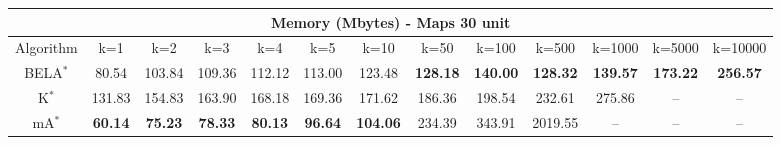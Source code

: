 \begin{tabular}{c|cccccccccccc}\toprule
\multicolumn{13}{c}{Memory (Mbytes) - Maps 30 unit}\\ \midrule
Algorithm & k=1 & k=2 & k=3 & k=4 & k=5 & k=10 & k=50 & k=100 & k=500 & k=1000 & k=5000 & k=10000 \\ \midrule
BELA$^*$ & 80.54 & 103.84 & 109.36 & 112.12 & 113.00 & 123.48 & \textbf{128.18} & \textbf{140.00} & \textbf{128.32} & \textbf{139.57} & \textbf{173.22} & \textbf{256.57} \\
K$^*$ & 131.83 & 154.83 & 163.90 & 168.18 & 169.36 & 171.62 & 186.36 & 198.54 & 232.61 & 275.86 & -- & -- \\
mA$^*$ & \textbf{60.14} & \textbf{75.23} & \textbf{78.33} & \textbf{80.13} & \textbf{96.64} & \textbf{104.06} & 234.39 & 343.91 & 2019.55 & -- & -- & -- \\ \bottomrule 
\end{tabular}
